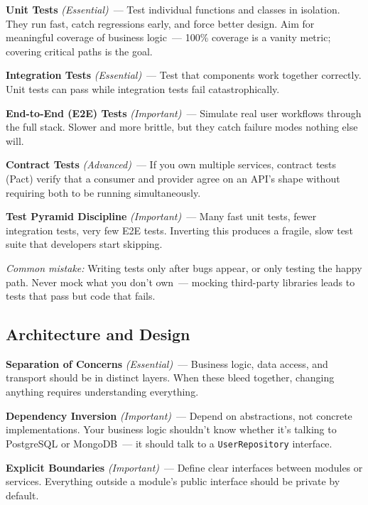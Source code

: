 \textbf{Unit Tests} \emph{(Essential)}~--- Test individual functions and classes in isolation. They run fast, catch regressions early, and force better design. Aim for meaningful coverage of business logic~--- 100\% coverage is a vanity metric; covering critical paths is the goal.

\textbf{Integration Tests} \emph{(Essential)}~--- Test that components work together correctly. Unit tests can pass while integration tests fail catastrophically.

\textbf{End-to-End (E2E) Tests} \emph{(Important)}~--- Simulate real user workflows through the full stack. Slower and more brittle, but they catch failure modes nothing else will.

\textbf{Contract Tests} \emph{(Advanced)}~--- If you own multiple services, contract tests (Pact) verify that a consumer and provider agree on an API's shape without requiring both to be running simultaneously.

\textbf{Test Pyramid Discipline} \emph{(Important)}~--- Many fast unit tests, fewer integration tests, very few E2E tests. Inverting this produces a fragile, slow test suite that developers start skipping.

\begin{notebox}

\emph{Common mistake:} Writing tests only after bugs appear, or only testing the happy path. Never mock what you don't own~--- mocking third-party libraries leads to tests that pass but code that fails.

\end{notebox}

\subsection*{Architecture and Design}\label{writing-good-code:architecture-and-design}

\textbf{Separation of Concerns} \emph{(Essential)}~--- Business logic, data access, and transport should be in distinct layers. When these bleed together, changing anything requires understanding everything.

\textbf{Dependency Inversion} \emph{(Important)}~--- Depend on abstractions, not concrete implementations. Your business logic shouldn't know whether it's talking to PostgreSQL or MongoDB~--- it should talk to a \texttt{UserRepository} interface.

\textbf{Explicit Boundaries} \emph{(Important)}~--- Define clear interfaces between modules or services. Everything outside a module's public interface should be private by default.

